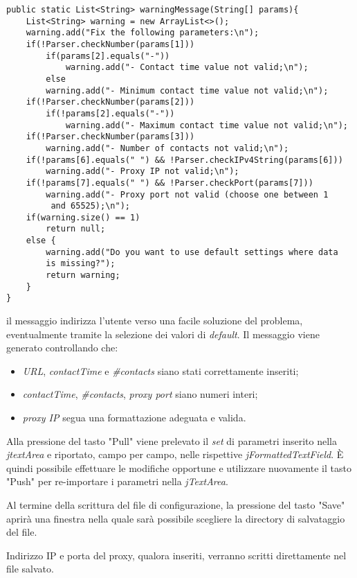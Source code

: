 \vspace{0.5cm}
\begin{lstlisting}
public static List<String> warningMessage(String[] params){
	List<String> warning = new ArrayList<>(); 
	warning.add("Fix the following parameters:\n");
	if(!Parser.checkNumber(params[1]))
		if(params[2].equals("-"))
			warning.add("- Contact time value not valid;\n");
		else
		warning.add("- Minimum contact time value not valid;\n");
	if(!Parser.checkNumber(params[2]))
		if(!params[2].equals("-"))
			warning.add("- Maximum contact time value not valid;\n");
	if(!Parser.checkNumber(params[3]))
		warning.add("- Number of contacts not valid;\n");
	if(!params[6].equals(" ") && !Parser.checkIPv4String(params[6]))
		warning.add("- Proxy IP not valid;\n");
	if(!params[7].equals(" ") && !Parser.checkPort(params[7]))
		warning.add("- Proxy port not valid (choose one between 1
		 and 65525);\n");
	if(warning.size() == 1)
		return null;
	else {
		warning.add("Do you want to use default settings where data 
		is missing?");
		return warning;
	}
}
\end{lstlisting}

il messaggio indirizza l'utente verso una facile soluzione del problema, eventualmente tramite la selezione dei valori di \textit{default}.
Il messaggio viene generato controllando che:
\begin{itemize}
	\item \textit{URL}, \textit{contactTime} e \textit{\#contacts} siano stati correttamente inseriti;
	\item \textit{contactTime}, \textit{\#contacts}, \textit{proxy port} siano numeri interi;
	\item \textit{proxy IP} segua una formattazione adeguata e valida.
\end{itemize}

Alla pressione del tasto "Pull" viene prelevato il \textit{set} di parametri inserito nella \textit{jtextArea} e riportato, campo per campo, nelle rispettive \textit{jFormattedTextField}. 
\`{E} quindi possibile effettuare le modifiche opportune e utilizzare nuovamente il tasto "Push" per re-importare i parametri nella \textit{jTextArea}. 

Al termine della scrittura del file di configurazione, la pressione del tasto "Save" aprir\`{a} una finestra nella quale sar\`{a} possibile scegliere la directory di salvataggio del file.

Indirizzo IP e porta del proxy, qualora inseriti, verranno scritti direttamente nel file salvato.

